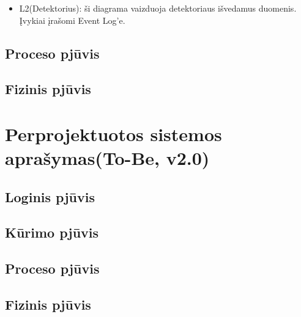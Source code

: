 \documentclass[oneside]{VUMIFPSkursinis}
\begin{document}
\begin{itemize}
		\item L2(Detektorius): ši diagrama vaizduoja detektoriaus išvedamus duomenis. Įvykiai įrašomi Event Log’e.


	\end{itemize}
\pagebreak
		

	

\subsection{Proceso pjūvis}
\subsection{Fizinis pjūvis}

\section{Perprojektuotos sistemos aprašymas(To-Be, v2.0)}
\subsection{Loginis pjūvis}
\subsection{Kūrimo pjūvis}
\subsection{Proceso pjūvis}
\subsection{Fizinis pjūvis}


\end{document}
